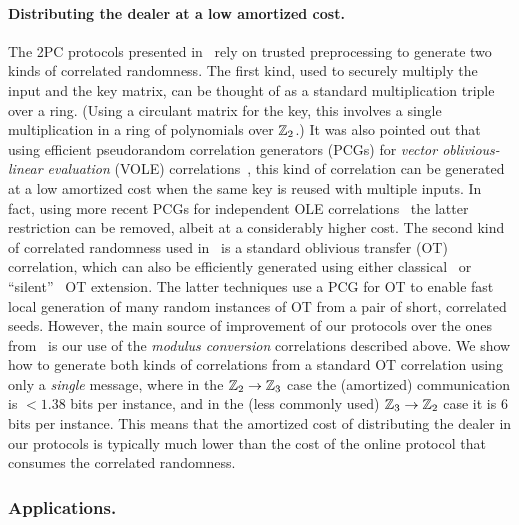 \paragraph{Distributing the dealer at a low amortized cost.} The 2PC protocols presented in~\cite{boneh2018-darkmatter} rely on trusted preprocessing to generate two kinds of correlated randomness. The first kind, used to securely multiply the input and the key matrix, can be thought of as a standard multiplication triple over a ring. (Using a circulant matrix for the key, this involves a single multiplication in a ring of polynomials over $\mathbb{Z}_2$.)  It was also pointed out that using efficient pseudorandom correlation generators (PCGs) for {\em vector oblivious-linear evaluation} (VOLE) correlations~\cite{BCGI18,BoyleetalCCS19,SchopmanetalCCS19}, this kind of correlation can be generated at a low amortized cost when the same key is reused with multiple inputs. In fact, using more recent PCGs for independent OLE correlations~\cite{PCGRingLPNCrypto20} the latter restriction can be removed, albeit at a considerably higher cost.  The second kind of correlated randomness used in~\cite{boneh2018-darkmatter} is a standard oblivious transfer (OT) correlation, which can also be efficiently generated using either classical~\cite{IKNP} or ``silent''~\cite{PCGCrypto19,BoyleetalCCS19,yang2020-ferret} OT extension. The latter techniques use a PCG for OT to enable fast local generation of many random instances of OT from a pair of short, correlated seeds.  
However, the main source of improvement of our protocols over the ones from~\cite{boneh2018-darkmatter}  is our use of the {\em modulus conversion} correlations described above. We show how to generate both kinds of correlations from a standard OT correlation using only a {\em single} message, where in the $\mathbb{Z}_2 \to \mathbb{Z}_3$ case the (amortized) communication is $<1.38$ bits per instance, and in the (less commonly used) $\mathbb{Z}_3 \to \mathbb{Z}_2$ case it is $6$ bits per instance. This means that the amortized cost of distributing the dealer in our protocols is typically much lower than the cost of the online protocol that consumes the correlated randomness.


\subsubsection{Applications.}



